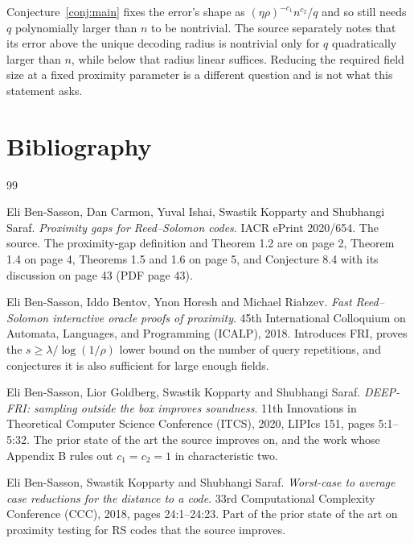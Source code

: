\documentclass{conjura-conjecture}
\begin{document}
\begin{remark}
Conjecture~\ref{conj:main} fixes the error's shape as
$(\eta\rho)^{-c_{1}} n^{c_{2}}/q$ and so still needs $q$ polynomially
larger than $n$ to be nontrivial. The source separately notes that its
error above the unique decoding radius is nontrivial only for $q$
quadratically larger than $n$, while below that radius linear suffices.
Reducing the required field size at a fixed proximity parameter is a
different question and is not what this statement asks.
\end{remark}

\section{Bibliography}

\begin{conjurabibliography}{99}

Eli Ben-Sasson, Dan Carmon, Yuval Ishai, Swastik Kopparty and Shubhangi
Saraf.
\emph{Proximity gaps for Reed--Solomon codes}.
IACR ePrint 2020/654.
The source. The proximity-gap definition and Theorem 1.2 are on page 2,
Theorem 1.4 on page 4, Theorems 1.5 and 1.6 on page 5, and
Conjecture 8.4 with its discussion on page 43 (PDF page 43).

Eli Ben-Sasson, Iddo Bentov, Ynon Horesh and Michael Riabzev.
\emph{Fast Reed--Solomon interactive oracle proofs of proximity}.
45th International Colloquium on Automata, Languages, and Programming
(ICALP), 2018.
Introduces FRI, proves the $s \ge \lambda/\log(1/\rho)$ lower bound on
the number of query repetitions, and conjectures it is also sufficient
for large enough fields.

Eli Ben-Sasson, Lior Goldberg, Swastik Kopparty and Shubhangi Saraf.
\emph{DEEP-FRI: sampling outside the box improves soundness}.
11th Innovations in Theoretical Computer Science Conference (ITCS), 2020,
LIPIcs 151, pages 5:1--5:32.
The prior state of the art the source improves on, and the work whose
Appendix B rules out $c_{1} = c_{2} = 1$ in characteristic two.

Eli Ben-Sasson, Swastik Kopparty and Shubhangi Saraf.
\emph{Worst-case to average case reductions for the distance to a code}.
33rd Computational Complexity Conference (CCC), 2018, pages
24:1--24:23.
Part of the prior state of the art on proximity testing for RS codes that
the source improves.

\end{conjurabibliography}
\end{document}
